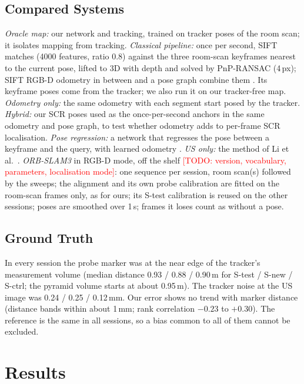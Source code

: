 \documentclass[journal]{IEEEtran}
\newcommand{\tbd}[1]{\textcolor{red}{[TODO: #1]}}
\newcommand{\Stest}{S-test}
\newcommand{\Snew}{S-new}
\newcommand{\Sctrl}{S-ctrl}
\begin{document}
\subsection{Compared Systems}
\label{sec:baselines}
\emph{Oracle map:} our network and tracking, trained on tracker poses of the room scan; it isolates mapping from tracking. \emph{Classical pipeline:} once per second, SIFT \cite{lowe2004sift} matches (4000 features, ratio 0.8) against the three room-scan keyframes nearest to the current pose, lifted to 3D with depth and solved by PnP-RANSAC \cite{lepetit2009epnp} (4\,px); SIFT RGB-D odometry in between and a pose graph combine them \cite{TODO-classical-pipeline}. Its keyframe poses come from the tracker; we also run it on our tracker-free map. \emph{Odometry only:} the same odometry with each segment start posed by the tracker. \emph{Hybrid:} our SCR poses used as the once-per-second anchors in the same odometry and pose graph, to test whether odometry adds to per-frame SCR localisation. \emph{Pose regression:} a network that regresses the pose between a keyframe and the query, with learned odometry \cite{TODO-own-pose-regression}. \emph{US only:} the method of Li et al.\ \cite{li2024longterm}. \emph{ORB-SLAM3} \cite{campos2021orbslam3} in RGB-D mode, off the shelf \tbd{version, vocabulary, parameters, localisation mode}: one sequence per session, room scan(s) followed by the sweeps; the alignment and its own probe calibration are fitted on the room-scan frames only, as for ours; its \Stest{} calibration is reused on the other sessions; poses are smoothed over 1\,s; frames it loses count as without a pose.

\subsection{Ground Truth}
In every session the probe marker was at the near edge of the tracker's measurement volume (median distance 0.93 / 0.88 / 0.90\,m for \Stest{} / \Snew{} / \Sctrl{}; the pyramid volume starts at about 0.95\,m). The tracker noise at the US image was 0.24 / 0.25 / 0.12\,mm. Our error shows no trend with marker distance (distance bands within about 1\,mm; rank correlation $-0.23$ to $+0.30$). The reference is the same in all sessions, so a bias common to all of them cannot be excluded.

\section{Results}
\label{sec:results}
\end{document}
